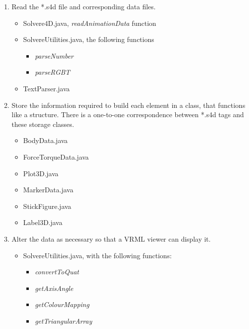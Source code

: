 \documentclass[singlecolumn,12pt]{article}
\begin{document}
\begin{enumerate}
\item Read the *.s4d file and corresponding data files.
\begin{itemize}
\item Solvere4D.java, \emph{readAnimationData} function
\item SolvereUtilities.java, the following functions
\begin{itemize}
\item \emph{parseNumber}
\item \emph{parseRGBT}
\end{itemize}
\item TextParser.java
\end{itemize}

\item Store the information required to build each element in a
class, that functions like a structure. There is a one-to-one
correspondence between *.s4d tags and these storage classes.
\begin{itemize}
\item BodyData.java
\item ForceTorqueData.java
\item Plot3D.java
\item MarkerData.java
\item StickFigure.java
\item Label3D.java
\end{itemize}

\item Alter the data as necessary so that a VRML viewer can display
it.
\begin{itemize}
\item SolvereUtilities.java, with the following functions:
\begin{itemize}
\item \emph{convertToQuat}
\item \emph{getAxisAngle}
\item \emph{getColourMapping}
\item \emph{getTriangularArray}
\end{itemize}
\end{itemize}


\end{enumerate}
\end{document}
